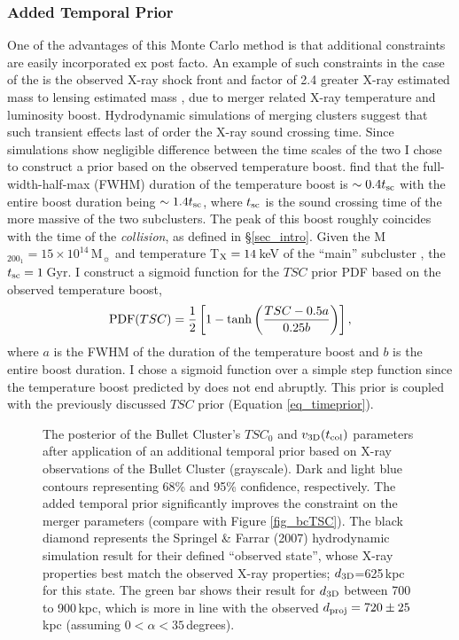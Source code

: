 \documentclass[12pt]{emulateapj}
\begin{document}
\subsubsection{Added Temporal Prior}\label{sec_addedprior}

One of the advantages of this Monte Carlo method is that additional constraints are easily incorporated ex post facto.
An example of such constraints in the case of the  is the observed X-ray shock front and factor of 2.4 greater X-ray estimated mass to lensing estimated mass \citep{Markevitch:2006wv}, due to merger related X-ray temperature and luminosity boost.  
Hydrodynamic simulations of merging clusters \citep[e.g.][]{Ricker:2001ju,Randall:2002kk} suggest that such transient effects last of order the X-ray sound crossing time.
Since simulations show negligible difference between the time scales of the two I chose to construct a prior based on the observed temperature boost.
\citet{Randall:2002kk} find that the full-width-half-max (FWHM) duration of the temperature boost is $\sim 0.4 t_{\rm sc}$ with the entire boost duration being $\sim 1.4 t_{\rm sc}$, where $t_{\rm sc}$ is the sound crossing time of the more massive of the two subclusters.
The peak of this boost roughly coincides with the time of the \emph{collision}, as defined in \S\ref{sec_intro}.
Given the M$_{200_1}=15 \times 10^{14}$\,M$_\sun$ and temperature T$_{\rm X}=14$\,keV of the ``main'' subcluster \citep{Markevitch:2006wv}, the $t_{\rm sc}=1$\,Gyr.
I construct a sigmoid function for the $TSC$ prior PDF based on the observed temperature boost, 
\begin{displaymath}
{\rm PDF}(TSC) = \frac{1}{2}\left[1-\tanh\left(\frac{TSC-0.5 a}{0.25 b} \right)\right],
\end{displaymath}
where $a$ is the FWHM of the duration of the temperature boost and $b$ is the entire boost duration.
I chose a sigmoid function over a simple step function since the temperature boost predicted by \citet{Randall:2002kk} does not end abruptly.
This prior is coupled with the previously discussed $TSC$ prior (Equation \ref{eq_timeprior}).

\begin{figure}
\caption{
The posterior of the Bullet Cluster's $TSC_0$ and $v_{\rm 3D}(t_{\rm col})$ parameters after application of an additional temporal prior based on X-ray observations of the Bullet Cluster (grayscale).  
Dark and light blue contours representing 68\% and 95\% confidence, respectively.
The added temporal prior significantly improves the constraint on the merger parameters (compare with Figure \ref{fig_bcTSC}).
The black diamond represents the Springel \& Farrar (2007) hydrodynamic simulation result for their defined ``observed state'', whose X-ray properties best match the observed X-ray properties; $d_{\rm 3D}$=625\,kpc for this state.
The green bar shows their result for $d_{\rm 3D}$ between 700 to 900\,kpc, which is more in line with the observed $d_{\rm proj} = 720\pm 25$\,kpc (assuming $0<\alpha<35$\,degrees).
\label{fig_bcTSC_added}}
\end{figure}
\end{document}
